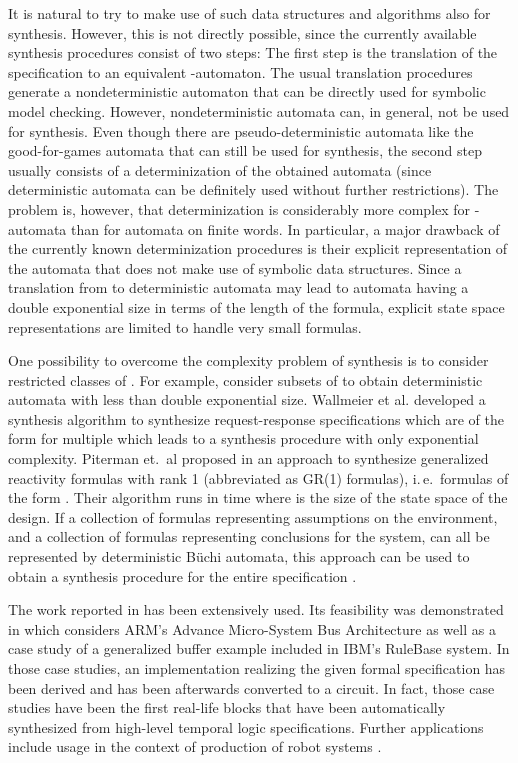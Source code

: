 \documentclass[submission,copyright,creativecommons]{eptcs}
\newcommand{\ie}{i.\,e.~}
\begin{document}
It is natural to try to make use of such data structures and algorithms also for \LTL{} synthesis. However, this is not directly possible, since the currently available \LTL{} synthesis procedures consist of two steps: The first step is the translation of the \LTL{} specification to an equivalent -automaton. The usual translation procedures generate a nondeterministic automaton that can be directly used for symbolic model checking. However, nondeterministic automata can, in general, not be used for \LTL{} synthesis. Even though there are pseudo-deterministic automata like the good-for-games automata that can still be used for \LTL{} synthesis, the second step usually consists of a determinization of the obtained automata (since deterministic automata can be definitely used without further restrictions). The problem is, however, that determinization is considerably more complex for -automata than for automata on finite words. In particular, a major drawback of the currently known determinization procedures is their explicit representation of the automata that does not make use of symbolic data structures. Since a translation from \LTL{} to deterministic automata may lead to automata having a double exponential size in terms of the length of the formula, explicit state space representations are limited to handle very small \LTL{} formulas.

One possibility to overcome the complexity problem of \LTL{} synthesis is to consider restricted classes of \LTL{}. For example, \cite{AlTo04,Maid00} consider subsets of \LTL{} to obtain deterministic automata with less than double exponential size. Wallmeier et al. \cite{WaHT03} developed a synthesis algorithm to synthesize request-response specifications which are of the form  for multiple  which leads to a synthesis procedure with only exponential complexity. Piterman et.~al proposed in \cite{PiPS06} an approach to synthesize generalized reactivity formulas with rank 1 (abbreviated as GR(1) formulas), \ie formulas of the form . Their algorithm runs in time  where  is the size of the state space of the design. If a collection  of \LTL{} formulas representing assumptions on the environment, and a collection  of formulas representing conclusions for the system, can all be represented by deterministic Büchi automata, this approach can be used to obtain a synthesis procedure for the entire \LTL{} specification . 

The work reported in \cite{PiPS06} has been extensively used. Its feasibility was demonstrated in \cite{BGJP07,BGJP07a,JGWB07} which considers ARM's Advance Micro-System Bus Architecture as well as a case study of a generalized buffer example included in IBM's RuleBase system. In those case studies, an implementation realizing the given formal specification has been derived and has been afterwards converted to a circuit. In fact, those case studies have been the first real-life blocks that have been automatically synthesized from high-level temporal logic specifications. Further applications include usage in the context of production of robot systems \cite{WoTM10}.
\end{document}
